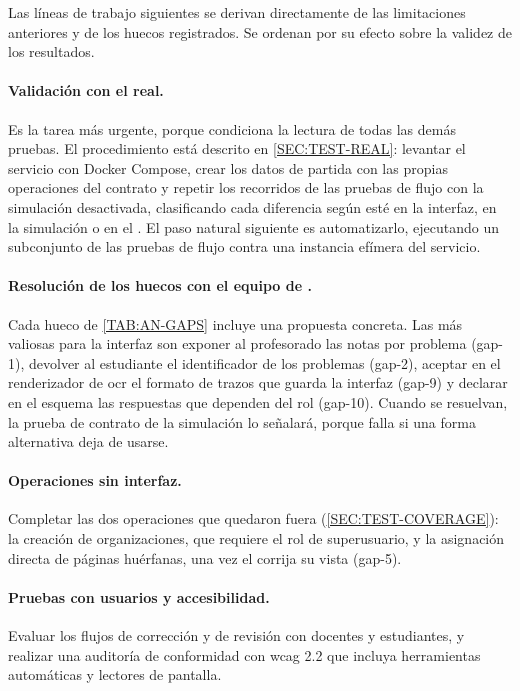 Las líneas de trabajo siguientes se derivan directamente de las limitaciones anteriores y de
los huecos registrados. Se ordenan por su efecto sobre la validez de los resultados.

\paragraph{Validación con el  real.} Es la tarea más urgente, porque condiciona
la lectura de todas las demás pruebas. El procedimiento está descrito en
\cref{SEC:TEST-REAL}: levantar el servicio con Docker Compose, crear los datos de partida con
las propias operaciones del contrato y repetir los recorridos de las pruebas de flujo con la
simulación desactivada, clasificando cada diferencia según esté en la interfaz, en la
simulación o en el . El paso natural siguiente es automatizarlo, ejecutando un
subconjunto de las pruebas de flujo contra una instancia efímera del servicio.

\paragraph{Resolución de los huecos con el equipo de .} Cada hueco de
\cref{TAB:AN-GAPS} incluye una propuesta concreta. Las más valiosas para la interfaz son
exponer al profesorado las notas por problema (gap-1), devolver al estudiante el
identificador de los problemas (gap-2), aceptar en el renderizador de \acs{ocr} el formato de
trazos que guarda la interfaz (gap-9) y declarar en el esquema las respuestas que dependen
del rol (gap-10). Cuando se resuelvan, la prueba de contrato de la simulación lo señalará,
porque falla si una forma alternativa deja de usarse.

\paragraph{Operaciones sin interfaz.} Completar las dos operaciones que quedaron fuera
(\cref{SEC:TEST-COVERAGE}): la creación de organizaciones, que requiere el rol de
superusuario, y la asignación directa de páginas huérfanas, una vez el 
corrija su vista (gap-5).

\paragraph{Pruebas con usuarios y accesibilidad.} Evaluar los flujos de corrección y de
revisión con docentes y estudiantes, y realizar una auditoría de conformidad con \acs{wcag}
2.2 que incluya herramientas automáticas y lectores de pantalla.

